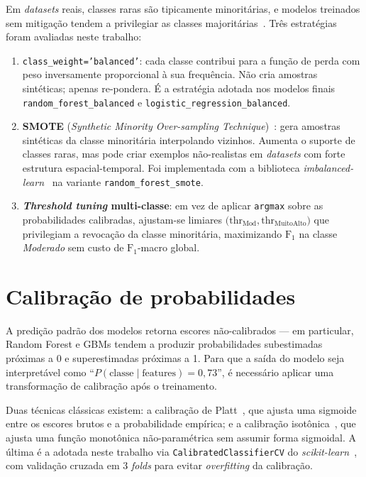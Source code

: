 \documentclass[tcc2]{uftex}
\begin{document}
Em \emph{datasets} reais, classes raras são tipicamente minoritárias, e modelos treinados sem mitigação tendem a privilegiar as classes majoritárias~\cite{he2009learning}. Três estratégias foram avaliadas neste trabalho:

\begin{enumerate}
  \item \texttt{class\_weight='balanced'}: cada classe contribui para a função de perda com peso inversamente proporcional à sua frequência. Não cria amostras sintéticas; apenas re-pondera. É a estratégia adotada nos modelos finais \texttt{random\_forest\_balanced} e \texttt{logistic\_regression\_balanced}.

  \item \textbf{SMOTE} (\emph{Synthetic Minority Over-sampling Technique})~\cite{chawla2002smote}: gera amostras sintéticas da classe minoritária interpolando vizinhos. Aumenta o suporte de classes raras, mas pode criar exemplos não-realistas em \emph{datasets} com forte estrutura espacial-temporal. Foi implementada com a biblioteca \emph{imbalanced-learn}~\cite{lemaitre2017imbalanced} na variante \texttt{random\_forest\_smote}.

  \item \textbf{\emph{Threshold tuning} multi-classe}: em vez de aplicar \texttt{argmax} sobre as probabilidades calibradas, ajustam-se limiares \(\bigl(\text{thr}_{\text{Mod}}, \text{thr}_{\text{MuitoAlto}}\bigr)\) que privilegiam a revocação da classe minoritária, maximizando \(\text{F}_1\) na classe \emph{Moderado} sem custo de \(\text{F}_1\)-macro global.
\end{enumerate}

\section{Calibração de probabilidades}
\label{sec:fund_calibracao}

A predição padrão dos modelos retorna escores não-calibrados --- em particular, Random Forest e GBMs tendem a produzir probabilidades subestimadas próximas a 0 e superestimadas próximas a 1. Para que a saída do modelo seja interpretável como ``\(P(\text{classe} \mid \text{features}) = 0{,}73\)'', é necessário aplicar uma transformação de calibração após o treinamento.

Duas técnicas clássicas existem: a calibração de Platt~\cite{platt1999probabilistic}, que ajusta uma sigmoide entre os escores brutos e a probabilidade empírica; e a calibração isotônica~\cite{zadrozny2002transforming}, que ajusta uma função monotônica não-paramétrica sem assumir forma sigmoidal. A última é a adotada neste trabalho via \texttt{CalibratedClassifierCV} do \emph{scikit-learn}~\cite{pedregosa2011scikit}, com validação cruzada em 3 \emph{folds} para evitar \emph{overfitting} da calibração.
\end{document}
